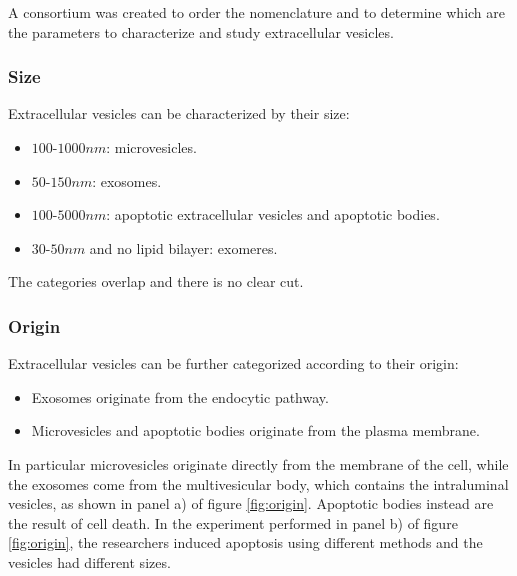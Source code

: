     A consortium was created to order the nomenclature and to determine which are the parameters to characterize and study extracellular vesicles.

        \subsubsection{Size}
        Extracellular vesicles can be characterized by their size:

        \begin{multicols}{2}
            \begin{itemize}
                \item $100$-$1000nm$: microvesicles.
                \item $50$-$150nm$: exosomes.
                \item $100$-$5000nm$: apoptotic extracellular vesicles and apoptotic bodies.
                \item $30$-$50nm$ and no lipid bilayer: exomeres.
            \end{itemize}
        \end{multicols}

        The categories overlap and there is no clear cut.

        \subsubsection{Origin}
        Extracellular vesicles can be further categorized according to their origin:

        \begin{multicols}{2}
            \begin{itemize}
                \item Exosomes originate from the endocytic pathway.
                \item Microvesicles and apoptotic bodies originate from the plasma membrane.
            \end{itemize}
        \end{multicols}

        In particular microvesicles originate directly from the membrane of the cell, while the exosomes come from the multivesicular body, which contains the intraluminal vesicles, as shown in panel a) of figure \ref{fig:origin}.
        Apoptotic bodies instead are the result of cell death.
        In the experiment performed in panel b) of figure \ref{fig:origin}, the researchers induced apoptosis using different methods and the vesicles had different sizes.

